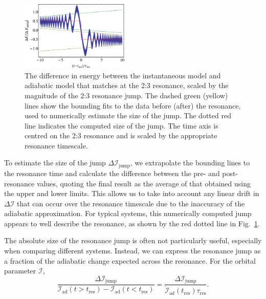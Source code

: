 \documentclass[aps,prd,amsfonts,amssymb,amsmath,nofootinbib,showpacs,superscriptaddress,twocolumn]{revtex4}
\newcommand{\figref}[1]{Fig.~\ref{fig:#1}}
\newcommand{\sub}[1]{\ensuremath{_\mathrm{#1}}}
\begin{document}
\begin{figure}
\centering
\includegraphics[width=0.46\textwidth]{Fig_res_jump_calc}
\caption{\label{fig:res-jump-calc}The difference in energy between the instantaneous model and adiabatic model that matches at the 2:3 resonance, scaled by the magnitude of the $2$:$3$ resonance jump. The dashed green (yellow) lines show the bounding fits to the data before (after) the resonance, used to numerically estimate the size of the jump. The dotted red line indicates the computed size of the jump. The time axis is centred on the 2:3 resonance and is scaled by the appropriate resonance timescale.}
\end{figure}

To estimate the size of the jump $\Delta \mathcal{I}_{\mathrm{jump}}$, we extrapolate the bounding lines to the resonance time and calculate the difference between the pre- and post-resonance values, quoting the final result as the average of that obtained using the upper and lower limits. This allows us to take into account any linear drift in $\Delta \mathcal{I}$ that can occur over the resonance timescale due to the inaccuracy of the adiabatic approximation.
For typical systems, this numerically computed jump appears to well describe the resonance, as shown by the red dotted line in \figref{res-jump-calc}.

The absolute size of the resonance jump is often not particularly useful, especially when comparing different systems. Instead, we can express the resonance jump as a fraction of the adiabatic change expected across the resonance. For the orbital parameter $\mathcal{I}$,
\begin{equation}
\label{eq:res-jump-ratio}
\frac{\Delta \mathcal{I}\sub{jump}}{\mathcal{I}\sub{ad}(t>t\sub{res})-\mathcal{I}\sub{ad}(t<t\sub{res})} = \frac{\Delta \mathcal{I}\sub{jump}}{\dot{\mathcal{I}}\sub{ad}(t\sub{res})\tau\sub{res}}.
\end{equation}
\end{document}
